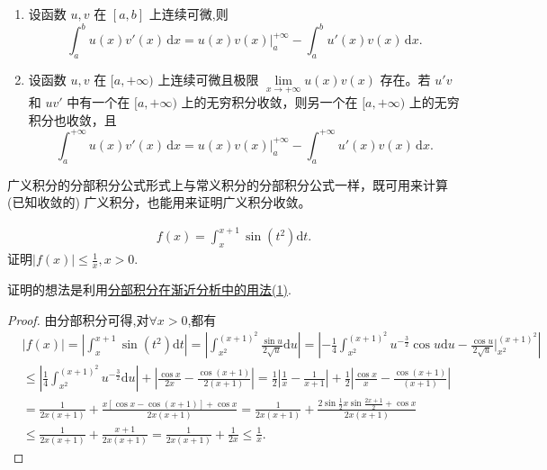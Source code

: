 \documentclass[../../main.tex]{subfiles}
\begin{document}
\begin{theorem}[分部积分公式]\label{theorem:分部积分公式}
\begin{enumerate}
\item 设函数 \( u, v \) 在 \([a, b]\) 上连续可微,则
\[
\int_a^b{u\left( x \right) v' \left( x \right) \,\mathrm{d}x}=u\left( x \right) v\left( x \right) \Big|_{a}^{+\infty}-\int_a^b{u'\left( x \right) v\left( x \right) \,\mathrm{d}x}.
\]

\item 设函数 \( u, v \) 在 \([a, +\infty)\) 上连续可微且极限 \( \lim\limits_{x \to +\infty} u(x)v(x) \) 存在。若 \( u'v \) 和 \( uv' \) 中有一个在 \([a, +\infty)\) 上的无穷积分收敛，则另一个在 \([a, +\infty)\) 上的无穷积分也收敛，且
\[
\int_a^{+\infty} u(x)v'(x) \, \mathrm{d}x = u(x)v(x) \Big |_a^{+\infty} - \int_a^{+\infty} u'(x)v(x) \, \mathrm{d}x.
\]
\end{enumerate}
\end{theorem}
\begin{remark}
广义积分的分部积分公式形式上与常义积分的分部积分公式一样，既可用来计算 (已知收敛的) 广义积分，也能用来证明广义积分收敛。
\end{remark}

\begin{example}
\begin{align*}
f\left( x \right) =\int_x^{x+1}{\sin \left( t^2 \right) \mathrm{d}t}.
\end{align*}
证明$\left| f\left( x \right) \right|\le \frac{1}{x},x>0$.
\end{example}
\begin{note}
证明的想法是利用\hyperref[分部积分在渐近分析中的用法(1)]{分部积分在渐近分析中的用法(1)}.
\end{note}
\begin{proof}
由分部积分可得,对$\forall x>0$,都有
\begin{align*}
&\left| f\left( x \right) \right|=\left| \int_x^{x+1}{\sin \left( t^2 \right) \mathrm{d}t} \right|=\left| \int_{x^2}^{\left( x+1 \right) ^2}{\frac{\sin u}{2\sqrt{u}}\mathrm{d}u} \right|=\left| -\frac{1}{4}\int_{x^2}^{\left( x+1 \right) ^2}{u^{-\frac{3}{2}}\cos u\mathrm{d}u}-\frac{\cos u}{2\sqrt{u}}\Big|_{x^2}^{\left( x+1 \right) ^2} \right|
\\
&\leqslant \left| \frac{1}{4}\int_{x^2}^{\left( x+1 \right) ^2}{u^{-\frac{3}{2}}\mathrm{d}u} \right|+\left| \frac{\cos x}{2x}-\frac{\cos \left( x+1 \right)}{2\left( x+1 \right)} \right|=\frac{1}{2}\left| \frac{1}{x}-\frac{1}{x+1} \right|+\frac{1}{2}\left| \frac{\cos x}{x}-\frac{\cos \left( x+1 \right)}{\left( x+1 \right)} \right|
\\
&=\frac{1}{2x\left( x+1 \right)}+\frac{x\left[ \cos x-\cos \left( x+1 \right) \right] +\cos x}{2x\left( x+1 \right)}=\frac{1}{2x\left( x+1 \right)}+\frac{2\sin \frac{1}{2}x\sin \frac{2x+1}{2}+\cos x}{2x\left( x+1 \right)}
\\
&\le \frac{1}{2x\left( x+1 \right)}+\frac{x+1}{2x\left( x+1 \right)}=\frac{1}{2x\left( x+1 \right)}+\frac{1}{2x}\leqslant \frac{1}{x}.
\end{align*}

\end{proof}
\end{document}
